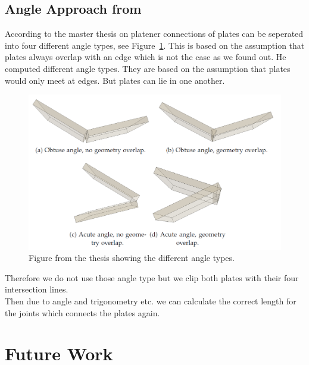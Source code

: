 \documentclass[../ClassicThesis.tex]{subfiles}
\begin{document}
\subsection{Angle Approach from \citeauthor{master-thesis} }
According to the master thesis on platener \cite{master-thesis} connections of plates can be seperated into four different angle types, see Figure~\ref{fig:dustinsAngles}. This is based on the assumption that plates always overlap with an edge which is not the case as we found out.
He computed different angle types. They are based on the assumption that plates would only meet at edges. But plates can lie in one another.
\begin{figure}[!ht]
    \centering
    \includegraphics[width=1\columnwidth]{Images/06-1-graph-dustinsAngleImage.png}
    \caption{Figure from the thesis \cite{master-thesis} showing the different angle types.}
    \label{fig:dustinsAngles}
\end{figure}
Therefore we do not use those angle type but we clip both plates with their four intersection lines. \\
Then due to angle and trigonometry etc. we can calculate the correct length for the joints which connects the plates again.

\section{Future Work}\label{futureWork}
\end{document}
